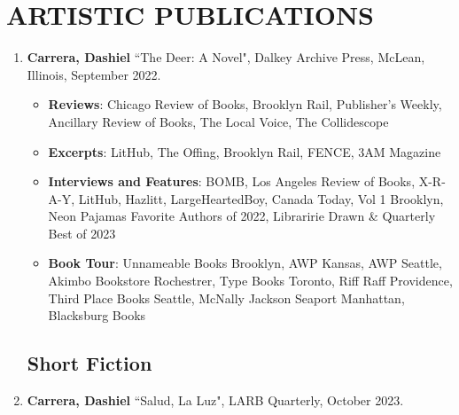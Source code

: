  \section{ARTISTIC PUBLICATIONS}
 \begin{enumerate}
 
 \subsection{Novels}
 \item \textbf{Carrera, Dashiel} ``The Deer: A Novel", Dalkey Archive Press, McLean, Illinois, September 2022. \\
 	\begin{itemize}
		\item \textbf{Reviews}: Chicago Review of Books, Brooklyn Rail, Publisher's Weekly, Ancillary Review of Books, The Local Voice, The Collidescope
		\item \textbf{Excerpts}: LitHub, The Offing, Brooklyn Rail, FENCE, 3AM Magazine
		\item \textbf{Interviews and Features}: BOMB, Los Angeles Review of Books, X-R-A-Y, LitHub, Hazlitt, LargeHeartedBoy, Canada Today, Vol 1 Brooklyn, Neon Pajamas Favorite Authors of 2022, Libraririe Drawn \& Quarterly Best of 2023	
		\item \textbf{Book Tour}: Unnameable Books Brooklyn, AWP Kansas, AWP Seattle, Akimbo Bookstore Rochestrer, Type Books Toronto, Riff Raff Providence, Third Place Books Seattle, McNally Jackson Seaport Manhattan, Blacksburg Books	
	\end{itemize} 
 
 
\subsection{Short Fiction}
\item \textbf{Carrera, Dashiel} ``Salud, La Luz", LARB Quarterly, October 2023. \\



\end{enumerate}

